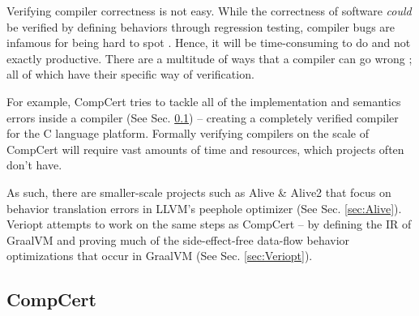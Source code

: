 Verifying compiler correctness is not easy. While the correctness of software \emph{could} be verified by defining behaviors through 
regression testing, compiler bugs are infamous for being hard to spot \cite{testing, compcertVerification}. Hence, it will be time-consuming to 
do and not exactly productive. There are a multitude of ways that a compiler can go wrong \cite[Sec. 1.2]{CompilerOptimization}; 
all of which have their specific way of verification. 

For example, CompCert \cite{compcertVerification} tries to tackle all of the implementation and semantics errors inside a compiler 
(See Sec. \ref{sec:CompCert}) -- creating a completely verified compiler for the C language platform. Formally verifying compilers on the scale of 
CompCert will require vast amounts of time and resources, which projects often don't have.

As such, there are smaller-scale projects such as Alive \cite{AliveInLean} \& Alive2 \cite{Alive2} that focus on behavior translation errors 
in LLVM's peephole optimizer (See Sec. \ref{sec:Alive}). Veriopt attempts to work on the same steps as CompCert -- by defining the IR of GraalVM and 
proving much of the side-effect-free data-flow behavior optimizations that occur in GraalVM 
\cite{ATVA21_GraalVM_IR_Semantics,Term_Graph_Optimizations} (See Sec. \ref{sec:Veriopt}).

\subsection{CompCert}
\label{sec:CompCert}

